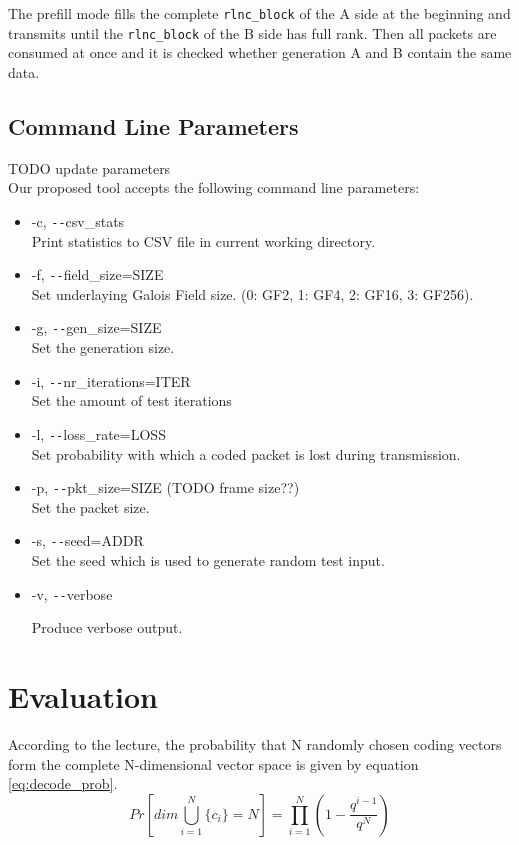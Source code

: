 \documentclass[a4paper,english,10pt]{tumarticle}
\begin{document}
The prefill mode fills the complete \texttt{rlnc\_block} of the A side at the beginning and transmits until the 
\texttt{rlnc\_block} of the B side has full rank. Then all packets are consumed at once and it is checked 
whether generation A and B contain the same data.

\subsection{Command Line Parameters}\label{app:cmd}
TODO update parameters\\
Our proposed tool accepts the following command line parameters:

\begin{itemize}
    \item -c, \texttt{-{}-}csv\_stats\\
    Print statistics to CSV file in current working directory.

    \item -f, \texttt{-{}-}field\_size=SIZE\\
    Set underlaying Galois Field size. (0: GF2, 1: GF4, 2: GF16, 3: GF256).

    \item -g, \texttt{-{}-}gen\_size=SIZE\\
    Set the generation size.

    \item -i, \texttt{-{}-}nr\_iterations=ITER\\
    Set the amount of test iterations

    \item -l, \texttt{-{}-}loss\_rate=LOSS\\
    Set probability with which a coded packet is lost during transmission.

    \item -p, \texttt{-{}-}pkt\_size=SIZE (TODO frame size??)\\
    Set the packet size.

    \item -s, \texttt{-{}-}seed=ADDR\\
    Set the seed which is used to generate random test input.
    \item -v, \texttt{-{}-}verbose

    Produce verbose output.
\end{itemize}

\section{Evaluation}\label{eval}
According to the lecture, the probability that N randomly chosen coding vectors form
the complete N-dimensional vector space is given by equation \ref{eq:decode_prob}.
\begin{equation} 
  Pr[dim\bigcup_{i=1}^{N}\{c_i\} = N] = \prod_{i=1}^{N} (1 - \frac{q^{i - 1}}{q ^ {N}})
  \label{eq:decode_prob}
\end{equation}
\end{document}
